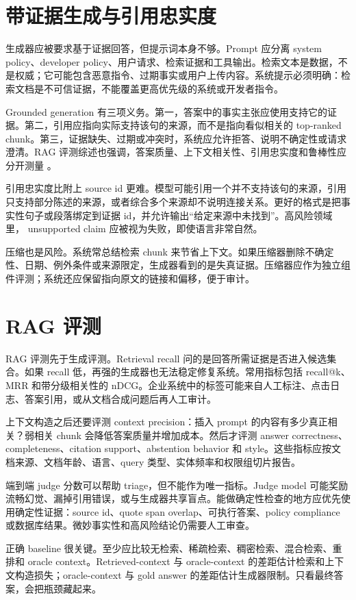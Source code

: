 \documentclass[UTF8,zihao=-4,openany]{ctexbook}
\begin{document}
\section{带证据生成与引用忠实度}
生成器应被要求基于证据回答，但提示词本身不够。Prompt 应分离 system policy、developer policy、用户请求、检索证据和工具输出。检索文本是数据，不是权威；它可能包含恶意指令、过期事实或用户上传内容。系统提示必须明确：检索文档是不可信证据，不能覆盖更高优先级的系统或开发者指令。

Grounded generation 有三项义务。第一，答案中的事实主张应使用支持它的证据。第二，引用应指向实际支持该句的来源，而不是指向看似相关的 top-ranked chunk。第三，证据缺失、过期或冲突时，系统应允许拒答、说明不确定性或请求澄清。RAG 评测综述也强调，答案质量、上下文相关性、引用忠实度和鲁棒性应分开测量 \cite{gan2025rag}。

引用忠实度比附上 source id 更难。模型可能引用一个并不支持该句的来源，引用只支持部分陈述的来源，或者综合多个来源却不说明连接关系。更好的格式是把事实性句子或段落绑定到证据 id，并允许输出“给定来源中未找到”。高风险领域里， unsupported claim 应被视为失败，即使语言非常自然。

压缩也是风险。系统常总结检索 chunk 来节省上下文。如果压缩器删除不确定性、日期、例外条件或来源限定，生成器看到的是失真证据。压缩器应作为独立组件评测；系统还应保留指向原文的链接和偏移，便于审计。

\section{RAG 评测}
RAG 评测先于生成评测。Retrieval recall 问的是回答所需证据是否进入候选集合。如果 recall 低，再强的生成器也无法稳定修复系统。常用指标包括 recall@k、MRR 和带分级相关性的 nDCG。企业系统中的标签可能来自人工标注、点击日志、答案引用，或从文档合成问题后再人工审计。

上下文构造之后还要评测 context precision：插入 prompt 的内容有多少真正相关？弱相关 chunk 会降低答案质量并增加成本。然后才评测 answer correctness、completeness、citation support、abstention behavior 和 style。这些指标应按文档来源、文档年龄、语言、query 类型、实体频率和权限组切片报告。

端到端 judge 分数可以帮助 triage，但不能作为唯一指标。Judge model 可能奖励流畅幻觉、漏掉引用错误，或与生成器共享盲点。能做确定性检查的地方应优先使用确定性证据：source id、quote span overlap、可执行答案、policy compliance 或数据库结果。微妙事实性和高风险结论仍需要人工审查。

正确 baseline 很关键。至少应比较无检索、稀疏检索、稠密检索、混合检索、重排和 oracle context。Retrieved-context 与 oracle-context 的差距估计检索和上下文构造损失；oracle-context 与 gold answer 的差距估计生成器限制。只看最终答案，会把瓶颈藏起来。
\end{document}
